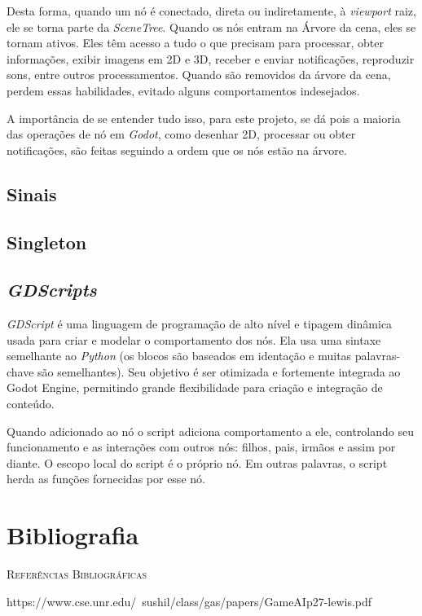 Desta forma, quando um nó é conectado, direta ou indiretamente, à 
\textit{viewport} raiz, ele se torna parte da \textit{SceneTree}. Quando os nós 
entram na Árvore da cena, eles se tornam ativos. Eles têm acesso a tudo o que 
precisam para processar, obter informações, exibir imagens em 2D e 3D, receber 
e enviar notificações, reproduzir sons, entre outros processamentos. Quando são
removidos da árvore da cena, perdem essas habilidades, evitado alguns 
comportamentos indesejados.

A importância de se entender tudo isso, para este projeto, se dá pois a maioria
das operações de nó em \textit{Godot}, como desenhar 2D, processar ou obter 
notificações, são feitas seguindo a ordem que os nós estão na árvore. 

\subsection{Sinais}
\subsection{Singleton}
\subsection{\textit{GDScripts}}

\textit{GDScript} é uma linguagem de programação de alto nível e tipagem 
dinâmica usada para criar e modelar o comportamento dos nós.
Ela usa uma sintaxe semelhante ao \textit{Python} (os blocos são 
baseados em identação e muitas palavras-chave são semelhantes). 
Seu objetivo é ser otimizada e fortemente integrada ao Godot Engine, permitindo
grande flexibilidade para criação e integração de conteúdo.

Quando adicionado ao nó o script adiciona comportamento a ele, controlando seu
funcionamento e as interações com outros nós: filhos, pais, irmãos e assim por 
diante. O escopo local do script é o próprio nó. Em outras palavras, o script 
herda as funções fornecidas por esse nó.

\section{Bibliografia}

\textsc{Referências Bibliográficas} 

\textnormal{https://www.cse.unr.edu/~sushil/class/gas/papers/GameAIp27-lewis.pdf}
